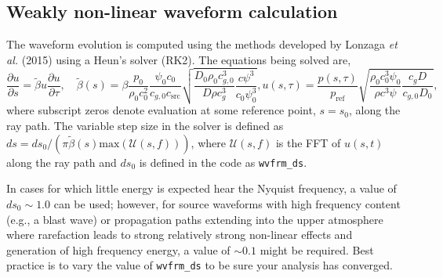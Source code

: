 \documentclass[10pt]{article}
\begin{document}
\subsection{Weakly non-linear waveform calculation}

The waveform evolution is computed using the methods developed by Lonzaga \textit{et al.} (2015) using a Heun's solver (RK2).  The equations being solved are,
\begin{subequations}
\begin{equation}
\frac{\partial u}{\partial s} = \tilde{\beta} u \frac{\partial u}{\partial \tau}, \quad 
\tilde{\beta} \left( s\right) = \beta \frac{p_0}{\rho_0 c_0^2} \frac{\psi_0 c_0}{c_{g,0} c_\text{src}} \sqrt{ \frac{D_0 \rho_0 c_{g,0}^3}{D \rho c_g^3} \frac{c \psi^3}{c_0 \psi_0^3}},
\end{equation}
\begin{equation}
 u \left( s, \tau \right) = \frac{p \left( s, \tau \right)}{p_\text{ref}} \sqrt{ \frac{\rho_0 c_0^3 \psi_0}{\rho c^3 \psi} \frac{c_{g} D}{c_{g,0} D_0}},
\end{equation}
\end{subequations}
where subscript zeros denote evaluation at some reference point, \(s = s_0\), along the ray path.  The variable step size in the solver is defined as \(ds = ds_0 /  \left( \pi \tilde{\beta} \left( s \right) \text{max} \left(\mathcal{U} \left( s, f \right) \right) \right)\), where \(\mathcal{U} \left( s, f \right)\) is the FFT of \(u \left(s, t \right)\) along the ray path and \(ds_0\) is defined in the code as \verb=wvfrm_ds=.  

In cases for which little energy is expected hear the Nyquist frequency, a value of \(ds_0 \sim1.0\) can be used; however, for source waveforms with high frequency content (e.g., a blast wave) or propagation paths extending into the upper atmosphere where rarefaction leads to strong relatively strong non-linear effects and generation of high frequency energy, a value of \(\sim0.1\) might be required.  Best practice is to vary the value of \verb=wvfrm_ds= to be sure your analysis has converged.


\newpage
\end{document}
